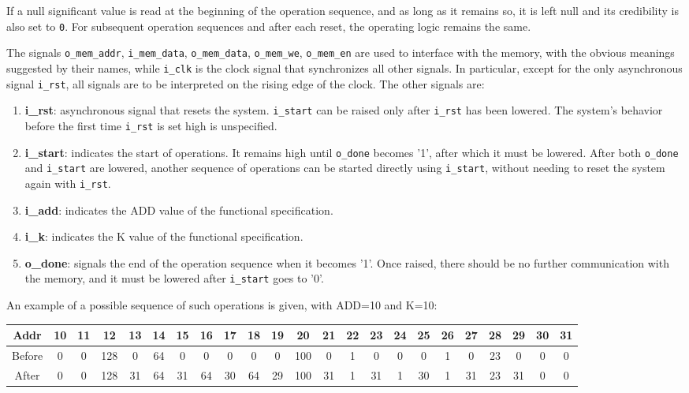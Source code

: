 \documentclass{article}
\begin{document}
If a null significant value is read at the beginning of the operation sequence, and as long as it remains so, it is left null and its credibility is also set to \texttt{0}. For subsequent operation sequences and after each reset, the operating logic remains the same.

The signals \texttt{o\_mem\_addr}, \texttt{i\_mem\_data}, \texttt{o\_mem\_data}, \texttt{o\_mem\_we}, \texttt{o\_mem\_en} are used to interface with the memory, with the obvious meanings suggested by their names, while \texttt{i\_clk} is the clock signal that synchronizes all other signals. In particular, except for the only asynchronous signal \texttt{i\_rst}, all signals are to be interpreted on the rising edge of the clock. The other signals are:

\begin{enumerate}
    \item \textbf{i\_rst}: asynchronous signal that resets the system. \texttt{i\_start} can be raised only after \texttt{i\_rst} has been lowered. The system's behavior before the first time \texttt{i\_rst} is set high is unspecified.
    \item \textbf{i\_start}: indicates the start of operations. It remains high until \texttt{o\_done} becomes '1', after which it must be lowered. After both \texttt{o\_done} and \texttt{i\_start} are lowered, another sequence of operations can be started directly using \texttt{i\_start}, without needing to reset the system again with \texttt{i\_rst}.
    \item \textbf{i\_add}: indicates the ADD value of the functional specification.
    \item \textbf{i\_k}: indicates the K value of the functional specification.
    \item \textbf{o\_done}: signals the end of the operation sequence when it becomes '1'. Once raised, there should be no further communication with the memory, and it must be lowered after \texttt{i\_start} goes to '0'.
\end{enumerate}

An example of a possible sequence of such operations is given, with ADD=10 and K=10:

\begin{table}[htbp]
    \begin{adjustwidth}{-1.cm}{}
    \centering
    \begin{tabular}{|c|c|c|c|c|c|c|c|c|c|c|c|c|c|c|c|c|c|c|c|c|c|c|}
        \hline
        Addr & 10 & 11 & 12 & 13 & 14 & 15 & 16 & 17 & 18 & 19 & 20 & 21 & 22 & 23 & 24 & 25 & 26 & 27 & 28 & 29 & 30 & 31 \\
        \hline
        Before & 0 & 0 & 128 & 0 & 64 & 0 & 0 & 0 & 0 & 0 & 100 & 0 & 1 & 0 & 0 & 0 & 1 & 0 & 23 & 0 & 0 & 0 \\
        After & 0 & 0 & 128 & 31 & 64 & 31 & 64 & 30 & 64 & 29 & 100 & 31 & 1 & 31 & 1 & 30 & 1 & 31 & 23 & 31 & 0 & 0 \\
        \hline
    \end{tabular}
    \end{adjustwidth}
\end{table}
\end{document}
